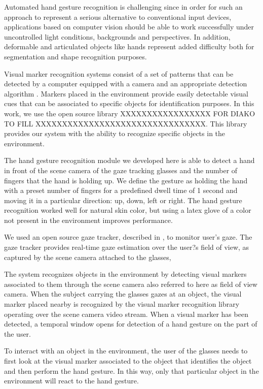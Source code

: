 \documentclass[jou,a4paper,notxfonts]{apa}
\begin{document}
Automated hand gesture recognition is challenging since in order for such an approach to represent a serious alternative
to conventional input devices, applications based on computer vision should be able to work successfully under
uncontrolled light conditions, backgrounds and perspectives. In addition, deformable and articulated objects like hands
represent added difficulty both for segmentation and shape recognition purposes.

Visual marker recognition systems consist of a set of patterns that can be detected by a computer equipped with a camera
and an appropriate detection algorithm \cite{middel19detection}. Markers placed in the environment provide easily
detectable visual cues that can be associated to specific objects for identification purposes. In this work, we use the
open source library XXXXXXXXXXXXXXXXX FOR DIAKO TO FILL XXXXXXXXXXXXXXXXXXXXXXXXXXXXXXXX. This library provides our
system with the ability to recognize specific objects in the environment.


The hand gesture recognition module we developed here is able to detect a hand in front of the scene camera of the gaze
tracking glasses and the number of fingers that the hand is holding up. We define the gesture
as holding the hand with a preset number of fingers for a predefined dwell time of 1 second and moving it in a particular direction:
up, down, left  or right. The hand gesture recognition worked well for natural skin color, but using a latex glove of a
color not present in the environment improves performance.


We used an open source gaze tracker, described in \cite{Mardanbegi2011}, to monitor user's gaze. The gaze tracker
provides real-time gaze estimation over the user?s field of view, as captured by the scene camera attached to the glasses,
 

The system recognizes objects in the environment by detecting visual markers associated to them through the scene camera
also referred to here as field of view camera. When the subject carrying the glasses gazes at an object, the visual
marker placed nearby is recognized by the visual marker recognition library operating over the scene camera video stream.
When a visual marker has been detected, a temporal window opens for detection of a hand gesture on the part of the user. 


To interact with an object in the environment, the user of the glasses needs to first look at the visual marker
associated to the object that identifies the object and then perform the hand gesture. In this way, only that particular
object in the environment will react to the hand gesture.
\end{document}
